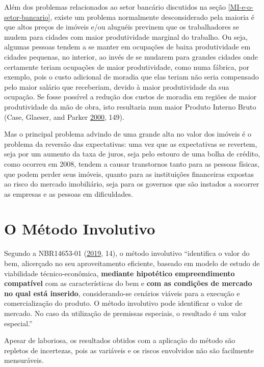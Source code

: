 \documentclass[
	12pt,				%
	oneside,			%
	a4paper,			%
	chapter=TITLE,		%
	section=TITLE,		%
	english,			%
	brazil				%
	]{abntex2}
\begin{document}
Além dos problemas relacionados ao setor bancário discutidos na seção
\ref{MI-e-o-setor-bancario}, existe um problema normalmente desconsiderado pela
maioria é que altos preços de imóveis e/ou aluguéis previnem que os
trabalhadores se mudem para cidades com maior produtividade marginal do
trabalho. Ou seja, algumas pessoas tendem a se manter em ocupações de baixa
produtividade em cidades pequenas, no interior, ao invés de se mudarem para
grandes cidades onde certamente teriam ocupações de maior produtividade, como
numa fábrica, por exemplo, pois o custo adicional de moradia que elas teriam
não seria compensado pelo maior salário que receberiam, devido à maior
produtividade da sua ocupação. Se fosse possível a redução dos custos de moradia
em regiões de maior produtividade da mão de obra, isto resultaria num maior
Produto Interno Bruto (Case, Glaeser, and Parker \protect\hyperlink{ref-Case2000}{2000}, 149).

Mas o principal problema advindo de uma grande alta no valor dos imóveis é o
problema da reversão das expectativas: uma vez que as expectativas se revertem,
seja por um aumento da taxa de juros, seja pelo estouro de uma bolha de crédito,
como ocorreu em 2008, tendem a causar transtornos tanto para as pessoas físicas,
que podem perder seus imóveis, quanto para as instituições financeiras expostas
ao risco do mercado imobiliário, seja para os governos que são instados a
socorrer as empresas e as pessoas em dificuldades.

\hypertarget{involutivo}{%
\chapter{O Método Involutivo}\label{involutivo}}

Segundo a NBR14653-01 (\protect\hyperlink{ref-NBR1465301}{2019}, 14), o método involutivo ``identifica o
valor do bem, alicerçado no seu aproveitamento eficiente, baseado em modelo de
estudo de viabilidade técnico-econômica, \textbf{mediante hipotético empreendimento
compatível} com as características do bem e \textbf{com as condições de mercado no
qual está inserido}, considerando-se cenários viáveis para a execução e
comercialização do produto. O método involutivo pode identificar o valor de
mercado. No caso da utilização de premissas especiais, o resultado é um valor
especial.''

Apesar de laboriosa, os resultados obtidos com a aplicação do método são repletos
de incertezas, pois as variáveis e os riscos envolvidos não são facilmente
mensuráveis.
\end{document}
